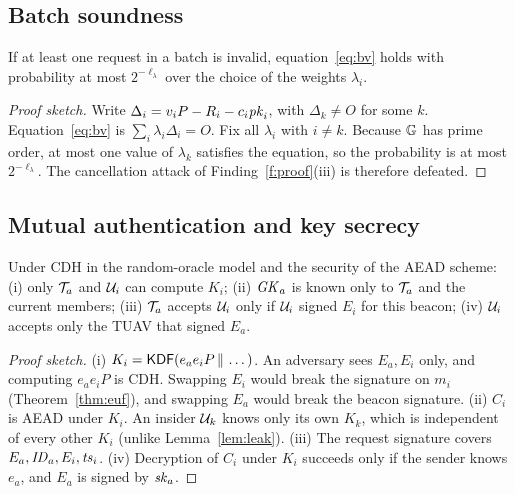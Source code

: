 \subsection{Batch soundness}
\begin{theorem}\label{thm:batch}
If at least one request in a batch is invalid, equation~\eqref{eq:bv} holds with probability at most $2^{-\ell_\lambda}$ over the choice of the weights $\lambda_i$.
\end{theorem}
\begin{proof}[Proof sketch]
Write $\Delta_i=v_iP-R_i-c_i\mathit{pk}_i$, with $\Delta_k\ne O$ for some $k$. Equation~\eqref{eq:bv} is $\sum_i\lambda_i\Delta_i=O$. Fix all $\lambda_i$ with $i\ne k$. Because $\mathbb{G}$
has prime order, at most one value of $\lambda_k$ satisfies the equation, so the probability is at most $2^{-\ell_\lambda}$. The cancellation attack of
Finding~\ref{f:proof}(iii) is therefore defeated.
\end{proof}

\subsection{Mutual authentication and key secrecy}
\begin{theorem}\label{thm:key}
Under CDH in the random-oracle model and the security of the AEAD scheme: (i) only $\mathcal{T}_a$ and $\mathcal{U}_i$ can compute $K_i$; (ii) $\mathit{GK}_a$ is known only to $\mathcal{T}_a$ and the
current members; (iii) $\mathcal{T}_a$ accepts $\mathcal{U}_i$ only if $\mathcal{U}_i$ signed $E_i$ for this beacon; (iv) $\mathcal{U}_i$ accepts only the TUAV that signed $E_a$.
\end{theorem}
\begin{proof}[Proof sketch]
(i) $K_i=\mathsf{KDF}(e_ae_iP\,\|\,\dots)$. An adversary sees $E_a,E_i$ only, and computing $e_ae_iP$ is CDH. Swapping $E_i$ would break the signature on $m_i$
(Theorem~\ref{thm:euf}), and swapping $E_a$ would break the beacon signature.
(ii) $C_i$ is AEAD under $K_i$. An insider $\mathcal{U}_k$ knows only its own $K_k$, which is independent of every other $K_i$ (unlike Lemma~\ref{lem:leak}).
(iii) The request signature covers $E_a,\mathit{ID}_a,E_i,\mathit{ts}_i$.
(iv) Decryption of $C_i$ under $K_i$ succeeds only if the sender knows $e_a$, and $E_a$ is signed by $\mathit{sk}_a$.
\end{proof}


